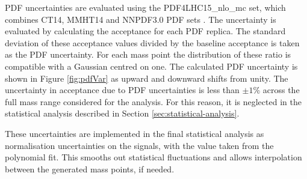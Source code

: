 PDF uncertainties are evaluated using the PDF4LHC15\_nlo\_mc set, which combines CT14, MMHT14 and NNPDF3.0 PDF sets \cite{0954-3899-43-2-023001}. The uncertainty is evaluated by calculating the acceptance for each PDF replica. The standard deviation of these acceptance values divided by the baseline acceptance is taken as the PDF uncertainty. For each mass point the distribution of these ratio is compatible with a Gaussian centred on one. The calculated PDF uncertainty is shown in Figure \ref{fig:pdfVar} as upward and downward shifts from unity. The uncertainty in acceptance due to PDF uncertainties is less than $\pm1\%$ across the full mass range considered for the analysis. For this reason, it is neglected in the statistical analysis described in Section \ref{sec:statistical-analysis}.


These uncertainties are implemented in the final statistical analysis as normalisation uncertainties on the signals, with the value taken from the polynomial fit. This smooths out statistical fluctuations and allows interpolation between the generated mass points, if needed.